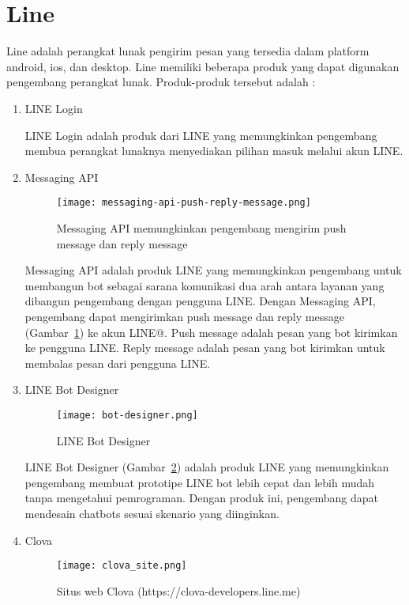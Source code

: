 \section{Line \cite{LINE-developer}}
\label{sec:Line}
Line adalah perangkat lunak pengirim pesan yang tersedia dalam platform android, ios, dan desktop. Line memiliki beberapa produk yang dapat digunakan pengembang perangkat lunak. Produk-produk tersebut adalah :
\begin{enumerate}
\item LINE Login

LINE Login adalah produk dari LINE yang memungkinkan pengembang membua perangkat lunaknya menyediakan pilihan masuk melalui akun LINE.

\item Messaging API

\begin{figure}[H]
	\centering  
	\texttt{[image: messaging-api-push-reply-message.png]}  
	\caption[Push message dan reply message pada Messaging API]{Messaging API memungkinkan pengembang mengirim push message dan reply message} 
	\label{fig:messaging-api-push-reply-message} 
\end{figure}

Messaging API adalah produk LINE yang memungkinkan pengembang untuk membangun bot sebagai sarana komunikasi dua arah antara layanan yang dibangun pengembang dengan pengguna LINE. Dengan Messaging API, pengembang dapat mengirimkan push message dan reply message (Gambar~\ref{fig:messaging-api-push-reply-message}) ke akun LINE@. Push message adalah pesan yang bot kirimkan ke pengguna LINE. Reply message adalah pesan yang bot kirimkan untuk membalas pesan dari pengguna LINE.

\item LINE Bot Designer

\begin{figure}[H]
	\centering  
	\texttt{[image: bot-designer.png]}  
	\caption[LINE Bot Designer]{LINE Bot Designer} 
	\label{fig:bot-designer} 
\end{figure}

LINE Bot Designer (Gambar~\ref{fig:bot-designer}) adalah produk LINE yang memungkinkan pengembang membuat prototipe LINE bot lebih cepat dan lebih mudah tanpa mengetahui pemrograman. Dengan produk ini, pengembang dapat mendesain chatbots sesuai skenario yang diinginkan.

\item Clova

\begin{figure}[H]
	\centering  
	\texttt{[image: clova\_site.png]}  
	\caption[Situs web Clova]{Situs web Clova (https://clova-developers.line.me)} 
	\label{fig:clova_site} 
\end{figure}


\end{enumerate}
